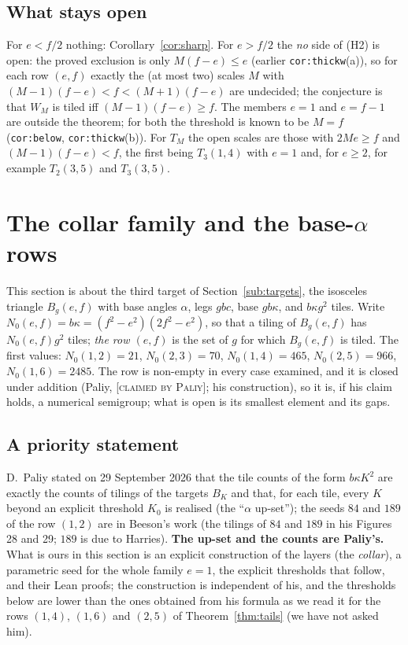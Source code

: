 \documentclass[11pt,reqno]{amsart}
\theoremstyle{plain}
\theoremstyle{definition}
\newcommand{\lab}[1]{\textup{[\textsc{#1}]}}
\newcommand{\CP}{\lab{claimed by Paliy}}
\begin{document}
\subsection{What stays open}
For $e<f/2$ nothing: Corollary~\ref{cor:sharp}.
For $e>f/2$ the \emph{no} side of (H2) is open: the proved exclusion is only $M(f-e)\le e$ (earlier \texttt{cor:thickw}(a)), so for each row $(e,f)$ exactly the (at most two) scales $M$ with $(M-1)(f-e)<f<(M+1)(f-e)$ are undecided; the conjecture is that $W_M$ is tiled iff $(M-1)(f-e)\ge f$.
The members $e=1$ and $e=f-1$ are outside the theorem; for both the threshold is known to be $M=f$ (\texttt{cor:below}, \texttt{cor:thickw}(b)).
For $T_M$ the open scales are those with $2Me\ge f$ and $(M-1)(f-e)<f$, the first being $T_3(1,4)$ with $e=1$ and, for $e\ge2$, for example $T_2(3,5)$ and $T_3(3,5)$.


\section{The collar family and the base-$\alpha$ rows}\label{sec:collar}

This section is about the third target of Section~\ref{sub:targets}, the isosceles triangle $B_g(e,f)$ with base angles $\alpha$, legs $gbc$, base $gb\kappa$, and $b\kappa g^2$ tiles.
Write $N_0(e,f)=b\kappa=(f^2-e^2)(2f^2-e^2)$, so that a tiling of $B_g(e,f)$ has $N_0(e,f)g^2$ tiles; \emph{the row $(e,f)$} is the set of $g$ for which $B_g(e,f)$ is tiled.
The first values: $N_0(1,2)=21$, $N_0(2,3)=70$, $N_0(1,4)=465$, $N_0(2,5)=966$, $N_0(1,6)=2485$.
The row is non-empty in every case examined, and it is closed under addition (Paliy, \CP{}; his construction), so it is, if his claim holds, a numerical semigroup; what is open is its smallest element and its gaps.

\subsection{A priority statement}
D.~Paliy stated on 29 September 2026 \cite{PaliyRepo} that the tile counts of the form $b\kappa K^2$ are exactly the counts of tilings of the targets $B_K$ and that, for each tile, every $K$ beyond an explicit threshold $K_0$ is realised (the ``$\alpha$ up-set''); the seeds $84$ and $189$ of the row $(1,2)$ are in Beeson's work (the tilings of $84$ and $189$ in his Figures 28 and 29; $189$ is due to Harries).
\textbf{The up-set and the counts are Paliy's.}
What is ours in this section is an explicit construction of the layers (the \emph{collar}), a parametric seed for the whole family $e=1$, the explicit thresholds that follow, and their Lean proofs; the construction is independent of his, and the thresholds below are lower than the ones obtained from his formula as we read it for the rows $(1,4)$, $(1,6)$ and $(2,5)$ of Theorem~\ref{thm:tails} (we have not asked him).
\end{document}
